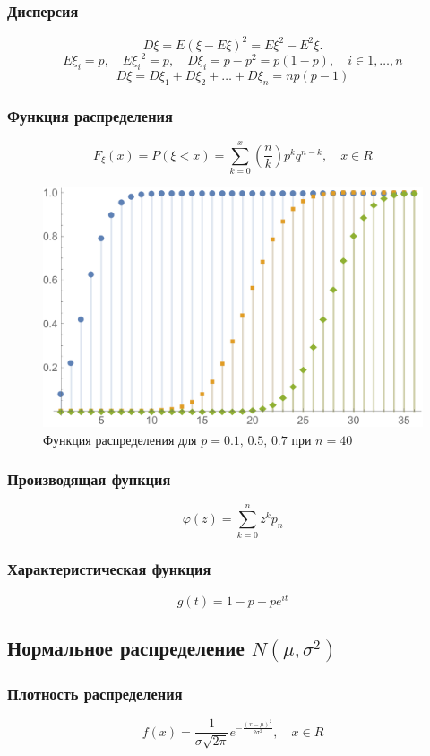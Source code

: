 \documentclass[a4paper]{article}
\begin{document}
\subsubsection{Дисперсия}
$$D\xi = E(\xi - E\xi)^2 = E\xi^2 - E^2\xi.$$
$$E\xi_i=p,\quad E{\xi_i}^2=p,\quad D\xi_i=p-p^2=p(1-p),\quad i\in {1,\ldots ,n}$$
$$D\xi = D\xi_1+D\xi_2+\ldots+D\xi_n=n p(p-1)$$

\subsubsection{Функция распределения}
$$F_\xi(x)= P(\xi<x)=\sum_{k=0}^{x}(\frac{n}{k})p^{k}q^{n-k},\quad x\in R$$
\begin{figure}[h!]
    \centering
    \includegraphics[scale=0.5]{BinomCDF.pdf}
    \caption{Функция распределения для $p=0.1,\,0.5,\,0.7$ при $n=40$}
\end{figure}

\subsubsection{Производящая функция}
$$\varphi(z) = \sum_{k=0}^{n}z^k p_n$$

\subsubsection{Характеристическая функция}
$$g(t) = 1-p+pe^{it}$$


\subsection{Нормальное распределение $N(\mu,\sigma^2)$}


\subsubsection{Плотность распределения}
$$f(x) = \frac{1}{\sigma\sqrt{2\pi}}e^{-\frac{(x-\mu)^2}{2{\sigma}^2}},\quad x\in R$$
\end{document}
